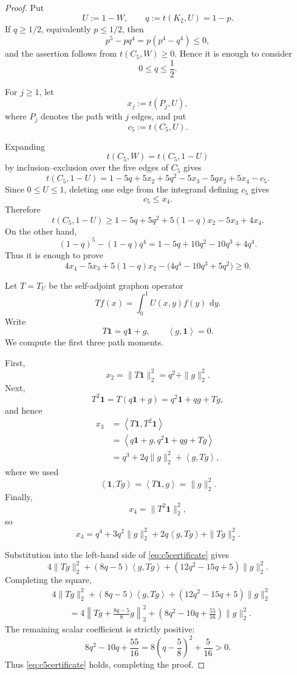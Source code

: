 \documentclass[11pt]{article}
\newcommand{\dd}{\,\mathrm{d}}
\newcommand{\one}{\mathbf 1}
\newcommand{\ip}[2]{\left\langle #1,#2\right\rangle}
\begin{document}
\begin{proof}
Put
\[
U:=1-W,
\qquad
q:=t(K_2,U)=1-p.
\]
If \(q\ge1/2\), equivalently \(p\le1/2\), then
\[
p^5-pq^4
=
p(p^4-q^4)
\le0,
\]
and the assertion follows from \(t(C_5,W)\ge0\).  Hence it is enough to
consider
\[
0\le q\le\frac12.
\]

For \(j\ge1\), let
\[
x_j:=t(P_j,U),
\]
where \(P_j\) denotes the path with \(j\) edges, and put
\[
c_5:=t(C_5,U).
\]

Expanding
\[
t(C_5,W)=t(C_5,1-U)
\]
by inclusion--exclusion over the five edges of \(C_5\) gives
\[
t(C_5,1-U)
=
1-5q+5x_2+5q^2
-5x_3-5qx_2+5x_4-c_5.
\]
Since \(0\le U\le1\), deleting one edge from the integrand defining
\(c_5\) gives
\[
c_5\le x_4.
\]
Therefore
\[
t(C_5,1-U)
\ge
1-5q+5q^2
+5(1-q)x_2
-5x_3
+4x_4.
\]
On the other hand,
\[
(1-q)^5-(1-q)q^4
=
1-5q+10q^2-10q^3+4q^4.
\]
Thus it is enough to prove
\begin{equation}\label{eq:c5certificate}
4x_4-5x_3+5(1-q)x_2
-
\bigl(4q^4-10q^3+5q^2\bigr)
\ge0.
\end{equation}

Let \(T=T_U\) be the self-adjoint graphon operator
\[
Tf(x)
=
\int_0^1U(x,y)f(y)\,\dd y.
\]
Write
\[
T\one=q\one+g,
\qquad
\ip{g}{\one}=0.
\]
We compute the first three path moments.

First,
\[
x_2
=
\|T\one\|_2^2
=
q^2+\|g\|_2^2.
\]
Next,
\[
T^2\one
=
T(q\one+g)
=
q^2\one+qg+Tg,
\]
and hence
\[
\begin{aligned}
x_3
&=
\ip{T\one}{T^2\one}\\
&=
\ip{q\one+g}{q^2\one+qg+Tg}\\
&=
q^3+2q\|g\|_2^2+\ip{g}{Tg},
\end{aligned}
\]
where we used
\[
\ip{\one}{Tg}
=
\ip{T\one}{g}
=
\|g\|_2^2.
\]
Finally,
\[
x_4
=
\|T^2\one\|_2^2,
\]
so
\[
x_4
=
q^4
+3q^2\|g\|_2^2
+2q\ip{g}{Tg}
+\|Tg\|_2^2.
\]

Substitution into the left-hand side of
\eqref{eq:c5certificate} gives
\[
4\|Tg\|_2^2
+
(8q-5)\ip{g}{Tg}
+
(12q^2-15q+5)\|g\|_2^2.
\]
Completing the square,
\[
\begin{aligned}
&4\|Tg\|_2^2
+
(8q-5)\ip{g}{Tg}
+
(12q^2-15q+5)\|g\|_2^2\\
&\qquad=
4\left\|
Tg+\frac{8q-5}{8}g
\right\|_2^2
+
\left(
8q^2-10q+\frac{55}{16}
\right)
\|g\|_2^2.
\end{aligned}
\]
The remaining scalar coefficient is strictly positive:
\[
8q^2-10q+\frac{55}{16}
=
8\left(q-\frac58\right)^2+\frac5{16}>0.
\]
Thus \eqref{eq:c5certificate} holds, completing the proof.
\end{proof}
\end{document}
